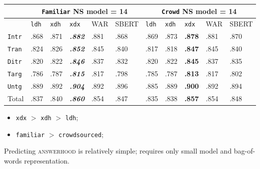\documentclass[xcolor={dvipsnames}]{beamer}
\newcommand{\feat}[1]{\textsc{#1}}
\newcommand{\param}[1]{\texttt{#1}}
\begin{document}
\begin{frame}
\begin{table}[htb!]
\begin{center}
\setlength{\tabcolsep}{.35em}
\begin{tabular}{|l||l|l|l||l|l||l|l|l||l|l|}
\hline
 & \multicolumn{5}{c||}{\param{Fam\-il\-iar} NS model = 14} & \multicolumn{5}{c|}{\param{Crowd} NS model = 14} \\
\hline
    		& \param{ldh}	& \param{xdh} &	\param{xdx} & WAR	& {\scriptsize SBERT} & \param{ldh}	& \param{xdh} &	\param{xdx} & WAR	& {\scriptsize SBERT} \\ \hline
\hline
\param{Intr}  & .868 & .871 & \textit{\textbf{.882}} & .881 & .868 & .869 & .873 & \textbf{.878} & .881 & .870 \\ \hline
\param{Tran}  & .824 & .826 & \textit{\textbf{.852}} & .845 & .840 & .817 & .818 & \textbf{.847} & .845 & .840 \\ \hline
\param{Ditr}  & .820 & .822 & \textit{\textbf{.846}} & .837 & .832 & .820 & .822 & \textbf{.845} & .837 & .835 \\ \hline
\hline
\param{Targ}  & .786 & .787 & \textit{\textbf{.815}} & .817 & .798 & .785 & .787 & \textbf{.813} & .817 & .802 \\ \hline
\param{Untg}  & .889 & .892 & \textit{\textbf{.904}} & .892 & .896 & .885 & .889 & \textbf{.900} & .892 & .894 \\ \hline
\hline
Total & .837 & .840 & \textit{\textbf{.860}} & .854 & .847 & .835 & .838 & \textbf{.857} & .854 & .848 \\ \hline
\end{tabular}
\end{center}
\end{table}

\begin{itemize}
\pause
\item \param{xdx} $>$ \param{xdh} $>$ \param{ldh};
\pause
\item \param{familiar} $>$ \param{crowdsourced};
\end{itemize}

Predicting \feat{answerhood} is relatively simple; requires only small model and bag-of-words representation.

\end{frame}
\end{document}
